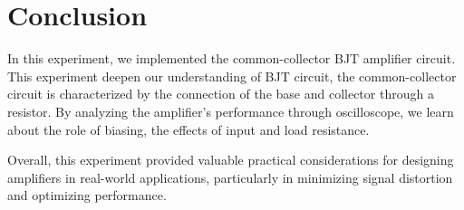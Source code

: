 \section{Conclusion}
    In this experiment, we implemented the common-collector BJT amplifier circuit. This experiment deepen our understanding of BJT circuit, the common-collector circuit is characterized by the connection of the base and collector through a resistor. By analyzing the amplifier's performance through oscilloscope, we learn about the role of biasing, the effects of input and load resistance.\par
    Overall, this experiment provided valuable practical considerations for designing amplifiers in real-world applications, particularly in minimizing signal distortion and optimizing performance.